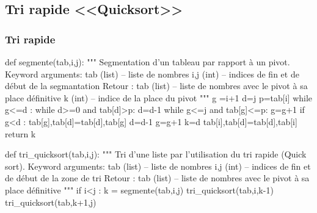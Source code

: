 \documentclass[10pt]{article}
\begin{document}
\subsection{Tri rapide <<Quicksort>>}
\subsubsection{Tri rapide}
\begin{py}
\begin{python}
def segmente(tab,i,j):
    """
    Segmentation d'un tableau par rapport à un pivot.
    Keyword arguments: 
    tab (list) -- liste de nombres
    i,j (int) -- indices de fin et de début de la segmantation
    Retour :    
    tab (list) -- liste de nombres avec le pivot à sa place définitive
    k (int) -- indice de la place du pivot
    """
    g =i+1
    d=j
    p=tab[i]
    while g<=d :
        while d>=0 and tab[d]>p:
            d=d-1
        while g<=j and tab[g]<=p:
            g=g+1
        if g<d :
            tab[g],tab[d]=tab[d],tab[g]
            d=d-1
            g=g+1
    k=d
    tab[i],tab[d]=tab[d],tab[i]
    return k
\end{python}

\begin{python}
def tri_quicksort(tab,i,j):
    """
    Tri d'une liste par l'utilisation du tri rapide (Quick sort).
    Keyword arguments: 
    tab (list) -- liste de nombres
    i,j (int) -- indices de fin et de début de la zone de tri
    Retour :    
    tab (list) -- liste de nombres avec le pivot à sa place définitive
    """
    if i<j :
        k = segmente(tab,i,j)
        tri_quicksort(tab,i,k-1)
        tri_quicksort(tab,k+1,j)
\end{python}
\end{py}
\end{document}
